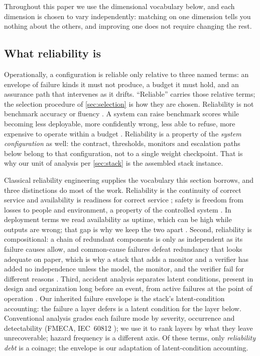 Throughout this paper we use the dimensional vocabulary below, and each dimension is chosen to
vary independently: matching on one dimension tells you nothing about the others, and improving
one does not require changing the rest.

\subsection{What reliability is}
Operationally, a configuration is reliable only relative to three named terms: an envelope of failure kinds it must not produce, a budget it must hold, and an assurance path that intervenes as it drifts. ``Reliable'' carries those relative terms; the selection procedure of \cref{sec:selection} is how they are chosen. Reliability is not benchmark accuracy or fluency \cite{measwhatmatters2025,quantconstruct2026}. A system can raise benchmark scores while
becoming less deployable, more confidently wrong, less able to refuse, more
expensive to operate within a budget \cite{leaderillusion2025}. Reliability is a property of the
\emph{system configuration} as well: the contract, thresholds, monitors and escalation paths
below belong to that configuration, not to a single weight checkpoint. That is why our
unit of analysis per \cref{sec:stack} is the assembled stack instance.

Classical reliability engineering supplies the vocabulary this section borrows, and three
distinctions do most of the work. Reliability is the continuity of correct service and
availability is readiness for correct service \cite{avizienis2004}; safety is freedom from
losses to people and environment, a property of the controlled system \cite{leveson2011}. In
deployment terms we read availability as uptime, which can be high while outputs are wrong; that
gap is why we keep the two apart \evjudge{}. Second, reliability is
compositional: a chain of redundant components is only as independent as its failure causes
allow, and common-cause failures defeat redundancy that looks adequate on paper, which is why a
stack that adds a monitor and a verifier has added no independence unless the model, the monitor,
and the verifier fail for different reasons \cite{leveson2011,leveson2018stpa}. Third, accident analysis separates latent
conditions, present in design and organization long before an event, from active failures at the
point of operation \cite{leveson2011}. Our inherited failure envelope is the stack's
latent-condition accounting: the failure a layer defers is a latent condition for the layer
below. Conventional analysis grades each failure mode by severity, occurrence and detectability
(FMECA, IEC~60812 \cite{iec60812}); we use it to rank layers by what they leave unrecoverable;
hazard frequency is a different axis.
Of these terms, only \emph{reliability debt} is a coinage;
the envelope is our adaptation of latent-condition accounting.

